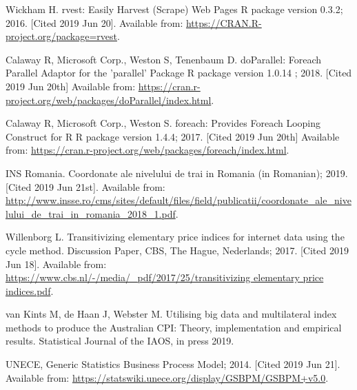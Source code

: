 \documentclass[]{article}
\begin{document}
\begin{thebibliography}{99}
Wickham H. rvest: Easily Harvest (Scrape) Web Pages {R package version 0.3.2}; 2016. [Cited 2019 Jun 20]. Available from:
\url{https://CRAN.R-project.org/package=rvest}.

Calaway R, Microsoft Corp., Weston S, Tenenbaum D. doParallel: Foreach Parallel Adaptor for the 'parallel' Package {R package version 1.0.14} ; 2018. [Cited 2019 Jun 20th] Available from: \url{https://cran.r-project.org/web/packages/doParallel/index.html}.

Calaway R, Microsoft Corp., Weston S. foreach: Provides Foreach Looping Construct for R {R package version 1.4.4}; 2017. [Cited 2019 Jun 20th]
Available from: \url{https://cran.r-project.org/web/packages/foreach/index.html}. 

INS Romania. Coordonate ale nivelului de trai in Romania (in Romanian); 2019. [Cited 2019 Jun 21st]. Available from:
\url{http://www.insse.ro/cms/sites/default/files/field/publicatii/coordonate_ale_nivelului_de_trai_in_romania_2018_1.pdf}.

Willenborg L. Transitivizing elementary price indices for internet data using the cycle method. Discussion Paper, CBS, The Hague, Nederlands; 2017. [Cited 2019 Jun 18]. 
Available from: \url{https://www.cbs.nl/-/media/_pdf/2017/25/transitivizing elementary price indices.pdf}.

van Kints M, de Haan J, Webster M. Utilising big data and multilateral index methods to produce the Australian CPI: Theory, implementation and empirical results. Statistical Journal of the IAOS, in press 2019.

UNECE, Generic Statistics Business Process Model; 2014. [Cited 2019 Jun 21]. Available from:
\url{https://statswiki.unece.org/display/GSBPM/GSBPM+v5.0}.

\end{thebibliography}

\clearpage
\end{document}
